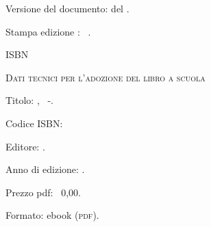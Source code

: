{{\vspace{2ex}
 Versione del documento: {\docvers} del {\oggi}.

 Stampa edizione \edizione : \mese\ \anno.

 ISBN \mcisbn

\vspace{2ex}
 {\scshape{Dati tecnici per l'adozione del libro a scuola}}

 Titolo: \serie, \titolo\ -\edizione.

 Codice ISBN: \mcisbn 

 Editore: \href{http://www.matematicamente.it}{\editore}. 

 Anno di edizione: \anno.

 Prezzo pdf: \officialeuro\ 0,00.

 Formato: ebook (\scshape{pdf}).
}}
